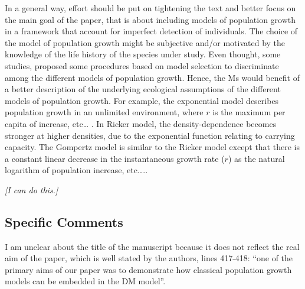 \documentclass[12pt,english]{article}
\begin{document}
\begin{spacing}{1.9}
\begin{flushleft}
In a general way, effort should be put on tightening the text and better focus
on the main goal of the paper, that is about including models of population
growth in a framework that account for imperfect detection of individuals. The
choice of the model of population growth might be subjective and/or motivated by
the knowledge of the life history of the species under study. Even thought, some
studies, proposed some procedures based on model selection to discriminate among
the different models of population growth. Hence, the Ms would benefit of a
better description of the underlying ecological assumptions of the different
models of population growth. For example, the exponential model describes
population growth in an unlimited environment, where $r$ is the maximum per capita
of increase, etc… . In Ricker model, the density-dependence becomes stronger at
higher densities, due to the exponential function relating to carrying capacity.
The Gompertz model is similar to the Ricker model except that there is a
constant linear decrease in the instantaneous growth rate ($r$) as the natural
logarithm of population increase, etc…..

\vspace{0.5cm}
\textit{[I can do this.]}
\vspace{0.5cm}

\subsection*{Specific Comments}
I am unclear about the title of the manuscript because it does not reflect the real aim of the
paper, which is well stated by the authors, lines 417-418: ``one of the primary aims of our
paper was to demonstrate how classical population growth models can be embedded in the
DM model''.


\end{flushleft}
\end{spacing}
\end{document}
